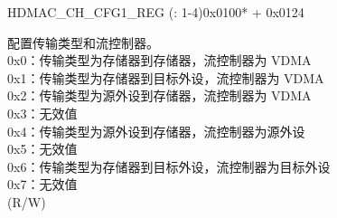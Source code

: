 \begin{register}{H}{DMAC\_CH\_CFG1\_REG (: 1-4)}{0x0100* + 0x0124}\label{regdesc:DMACCHNCFG1REG}
%
%
%
%
%
%
%
%
%
%
%
%
\regnewline%
\begin{regdesc}\begin{reglist}
\label{fielddesc:DMACCHNTTFC}\item [DMAC\_CH\regindex{n}\_TT\_FC] 配置传输类型和流控制器。\\
0x0：传输类型为存储器到存储器，流控制器为 VDMA \\
0x1：传输类型为存储器到目标外设，流控制器为 VDMA \\
0x2：传输类型为源外设到存储器，流控制器为 VDMA \\
0x3：无效值 \\
0x4：传输类型为源外设到存储器，流控制器为源外设 \\
0x5：无效值 \\
0x6：传输类型为存储器到目标外设，流控制器为目标外设\\
0x7：无效值\\
(R/W)





\end{reglist}
\end{regdesc}
\end{register}
